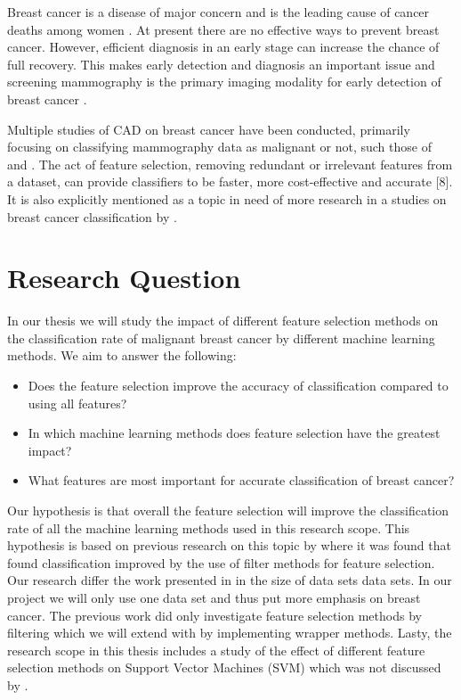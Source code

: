 \documentclass{kththesis}
\begin{document}
Breast cancer is a disease of major concern and is the leading cause of cancer deaths among women \parencite{althuis2005}. At present there are no effective ways to prevent breast cancer. However, efficient diagnosis in an early stage can increase the chance of full recovery. This makes early detection and diagnosis an important issue and screening mammography is the primary imaging modality for early detection of breast cancer \parencite{tabar2001}.

Multiple studies of CAD on breast cancer have been conducted, primarily focusing on classifying mammography data as malignant or not, such those of \textcite{ramos2012} and \textcite{akay2009}. The act of feature selection, removing redundant or irrelevant features from a dataset, can provide classifiers to be faster, more cost-effective and accurate [8]. It is also explicitly mentioned as a topic in need of more research in a studies on breast cancer classification by \textcite{akin2011}.

\section{Research Question}

In our thesis we will study the impact of different feature selection methods on the classification rate of malignant breast cancer by different machine learning methods. We aim to answer the following:

\begin{itemize}
  \item Does the feature selection improve the accuracy of classification compared to using all features?
  \item In which machine learning methods does feature selection have the greatest impact?
  \item What features are most important for accurate classification of breast cancer?
\end{itemize}
   Our hypothesis is that overall the feature selection will improve the classification rate of all the machine learning methods used in this research scope. This hypothesis is based on previous research on this topic by \textcite{karabulut2012} where it was found that found classification improved by the use of filter methods for feature selection.
Our research differ the work presented in \parencite{karabulut2012} in the size of data sets data sets. In our project we will only use one data set and thus put more emphasis on breast cancer. The previous work did only investigate feature selection methods by filtering which we will extend with by implementing wrapper methods. Lasty, the research scope in this thesis includes a study of the effect of different feature selection methods on Support Vector Machines (SVM) which was not discussed by \parencite{karabulut2012}.
\end{document}
